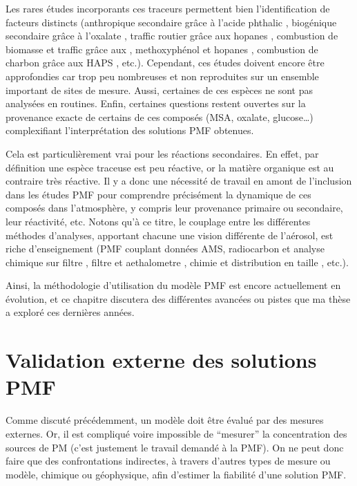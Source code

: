 Les rares études incorporants ces traceurs permettent bien l'identification de facteurs
distincts (anthropique secondaire grâce à l'acide phthalic
\autocite{srivastavaSpeciation2018a}, biogénique secondaire grâce à l'oxalate
\autocite{petitSources2019}, traffic routier grâce aux hopanes
\autocite{srivastavaSpeciation2018a}, combustion de biomasse et traffic grâce aux
, methoxyphénol et hopanes \autocite{chevrierChauffage2016}, combustion de
charbon grâce aux HAPS \autocite{gollyEtude2014}, etc.).
Cependant, ces études doivent encore être approfondies car trop peu nombreuses et non
reproduites sur un ensemble important de sites de mesure. Aussi, certaines de ces espèces ne
sont pas analysées en routines.
Enfin, certaines questions restent ouvertes sur la provenance exacte de certains de ces
composés (MSA, oxalate, glucose…) complexifiant l'interprétation des solutions PMF
obtenues.

Cela est particulièrement vrai pour les réactions secondaires. En effet, par définition
une espèce traceuse est peu réactive, or la matière organique est au contraire très
réactive. Il y a donc une nécessité de travail en amont de l'inclusion dans les études PMF
pour comprendre précisément la dynamique de ces composés dans l'atmosphère, y compris leur
provenance primaire ou secondaire, leur réactivité, etc. 
Notons qu'à ce titre, le couplage entre les différentes méthodes d'analyses, apportant
chacune une vision différente de l'aérosol, est riche d'enseignement (PMF couplant
données AMS, radiocarbon et analyse chimique sur filtre \autocite{vlachouDevelopment2019},
filtre et aethalometre \autocite{chevrierChauffage2016}, chimie et distribution en taille
\autocite{bozzettiSizeResolved2016}, etc.).

Ainsi, la méthodologie d'utilisation du modèle PMF est encore actuellement en évolution,
et ce chapitre discutera des différentes avancées ou pistes que ma thèse a exploré ces
dernières années.

\section{Validation externe des solutions PMF}%
\label{sec:confrontation_des_solutions_pmf}

Comme discuté précédemment, un modèle doit être évalué par des mesures externes. Or, il
est compliqué voire impossible de ``mesurer'' la concentration des sources de PM (c'est
justement le travail demandé à la PMF). On ne peut donc faire que des confrontations
indirectes, à travers d'autres types de mesure ou modèle, chimique ou géophysique, afin
d'estimer la fiabilité d'une solution PMF.


